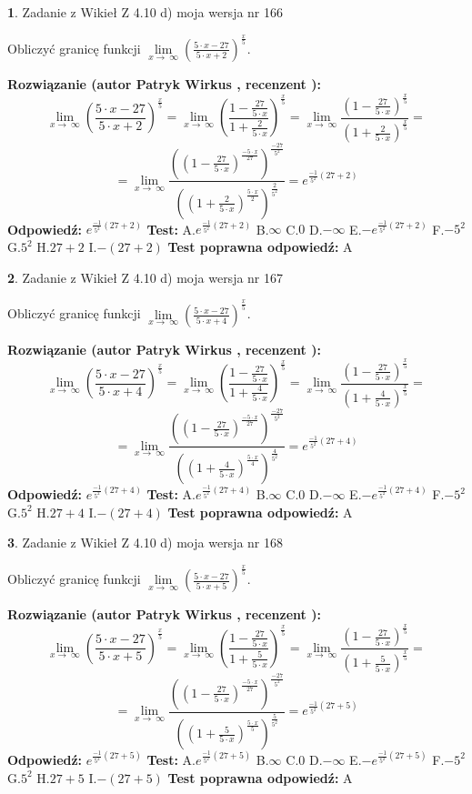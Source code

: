 \documentclass[12pt, a4paper]{article}
\theoremstyle{definition} %
\newtheorem{zad}{}
\newcommand{\zadStart}[1]{\begin{zad}#1\newline}
\newcommand{\zadStop}{\end{zad}}
\newcommand{\rozwStart}[2]{\noindent \textbf{Rozwiązanie (autor #1 , recenzent #2): }\newline}
\newcommand{\rozwStop}{\newline}
\newcommand{\odpStart}{\noindent \textbf{Odpowiedź:}\newline}
\newcommand{\odpStop}{\newline}
\newcommand{\testStart}{\noindent \textbf{Test:}\newline}
\newcommand{\testStop}{\newline}
\newcommand{\kluczStart}{\noindent \textbf{Test poprawna odpowiedź:}\newline}
\newcommand{\kluczStop}{\newline}
\begin{document}
\zadStart{Zadanie z Wikieł Z 4.10 d) moja wersja nr 166}


Obliczyć granicę funkcji  $\lim\limits_{x\to\ \infty}(\frac{5\cdot x-27}{5\cdot x+2})^{\frac{x}{5}}$.
\zadStop
\rozwStart{Patryk Wirkus}{}
$$\lim\limits_{x\to\ \infty}(\frac{5\cdot x-27}{5\cdot x+2})^{\frac{x}{5}} = \lim\limits_{x\to\ \infty}(\frac{1-\frac{27}{5\cdot x}}{1+\frac{2}{5\cdot x}})^{\frac{x}{5}}=\lim\limits_{x\to\ \infty}\frac{(1-\frac{27}{5\cdot x})^{\frac{x}{5}}}{(1+\frac{2}{5\cdot x})^{\frac{x}{5}}}=$$
$$=\lim\limits_{x\to\ \infty}\frac{((1-\frac{27}{5\cdot x})^{\frac{-5\cdot x}{27}})^{\frac{-27}{5^{2}}}}{((1+\frac{2}{5\cdot x})^{\frac{5\cdot x}{2}})^{\frac{2}{5^{2}}}}=e^{\frac{-1}{5^{2}}(27+2)}$$
\rozwStop
\odpStart
$e^{\frac{-1}{5^{2}}(27+2)}$
\odpStop
\testStart
A.$e^{\frac{-1}{5^{2}}(27+2)}$ B.$\infty$ C.$0$ D.$-\infty$ E.$-e^{\frac{-1}{5^{2}}(27+2)}$
F.$-5^{2}$ G.$5^{2}$
H.$27+2$
I.$-(27+2)$
\testStop
\kluczStart
A
\kluczStop



\zadStart{Zadanie z Wikieł Z 4.10 d) moja wersja nr 167}


Obliczyć granicę funkcji  $\lim\limits_{x\to\ \infty}(\frac{5\cdot x-27}{5\cdot x+4})^{\frac{x}{5}}$.
\zadStop
\rozwStart{Patryk Wirkus}{}
$$\lim\limits_{x\to\ \infty}(\frac{5\cdot x-27}{5\cdot x+4})^{\frac{x}{5}} = \lim\limits_{x\to\ \infty}(\frac{1-\frac{27}{5\cdot x}}{1+\frac{4}{5\cdot x}})^{\frac{x}{5}}=\lim\limits_{x\to\ \infty}\frac{(1-\frac{27}{5\cdot x})^{\frac{x}{5}}}{(1+\frac{4}{5\cdot x})^{\frac{x}{5}}}=$$
$$=\lim\limits_{x\to\ \infty}\frac{((1-\frac{27}{5\cdot x})^{\frac{-5\cdot x}{27}})^{\frac{-27}{5^{2}}}}{((1+\frac{4}{5\cdot x})^{\frac{5\cdot x}{4}})^{\frac{4}{5^{2}}}}=e^{\frac{-1}{5^{2}}(27+4)}$$
\rozwStop
\odpStart
$e^{\frac{-1}{5^{2}}(27+4)}$
\odpStop
\testStart
A.$e^{\frac{-1}{5^{2}}(27+4)}$ B.$\infty$ C.$0$ D.$-\infty$ E.$-e^{\frac{-1}{5^{2}}(27+4)}$
F.$-5^{2}$ G.$5^{2}$
H.$27+4$
I.$-(27+4)$
\testStop
\kluczStart
A
\kluczStop



\zadStart{Zadanie z Wikieł Z 4.10 d) moja wersja nr 168}


Obliczyć granicę funkcji  $\lim\limits_{x\to\ \infty}(\frac{5\cdot x-27}{5\cdot x+5})^{\frac{x}{5}}$.
\zadStop
\rozwStart{Patryk Wirkus}{}
$$\lim\limits_{x\to\ \infty}(\frac{5\cdot x-27}{5\cdot x+5})^{\frac{x}{5}} = \lim\limits_{x\to\ \infty}(\frac{1-\frac{27}{5\cdot x}}{1+\frac{5}{5\cdot x}})^{\frac{x}{5}}=\lim\limits_{x\to\ \infty}\frac{(1-\frac{27}{5\cdot x})^{\frac{x}{5}}}{(1+\frac{5}{5\cdot x})^{\frac{x}{5}}}=$$
$$=\lim\limits_{x\to\ \infty}\frac{((1-\frac{27}{5\cdot x})^{\frac{-5\cdot x}{27}})^{\frac{-27}{5^{2}}}}{((1+\frac{5}{5\cdot x})^{\frac{5\cdot x}{5}})^{\frac{5}{5^{2}}}}=e^{\frac{-1}{5^{2}}(27+5)}$$
\rozwStop
\odpStart
$e^{\frac{-1}{5^{2}}(27+5)}$
\odpStop
\testStart
A.$e^{\frac{-1}{5^{2}}(27+5)}$ B.$\infty$ C.$0$ D.$-\infty$ E.$-e^{\frac{-1}{5^{2}}(27+5)}$
F.$-5^{2}$ G.$5^{2}$
H.$27+5$
I.$-(27+5)$
\testStop
\kluczStart
A
\kluczStop
\end{document}
